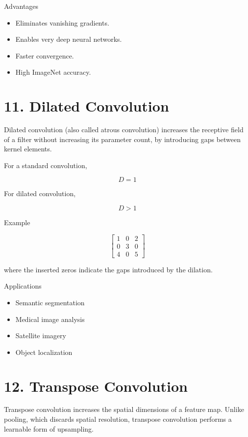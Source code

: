 \documentclass[11pt]{article}
\begin{document}
Advantages

\begin{itemize}
\item Eliminates vanishing gradients.
\item Enables very deep neural networks.
\item Faster convergence.
\item High ImageNet accuracy.
\end{itemize}


\section*{11. Dilated Convolution}

Dilated convolution (also called atrous convolution) increases the
receptive field of a filter without increasing its parameter count, by
introducing gaps between kernel elements.

For a standard convolution,

\[
D=1
\]

For dilated convolution,

\[
D>1
\]

Example

\[
\begin{bmatrix}
1 & 0 & 2\\
0 & 3 & 0\\
4 & 0 & 5
\end{bmatrix}
\]

where the inserted zeros indicate the gaps introduced by the dilation.

Applications

\begin{itemize}
\item Semantic segmentation
\item Medical image analysis
\item Satellite imagery
\item Object localization
\end{itemize}


\section*{12. Transpose Convolution}

Transpose convolution increases the spatial dimensions of a feature map.
Unlike pooling, which discards spatial resolution, transpose convolution
performs a learnable form of upsampling.
\end{document}
